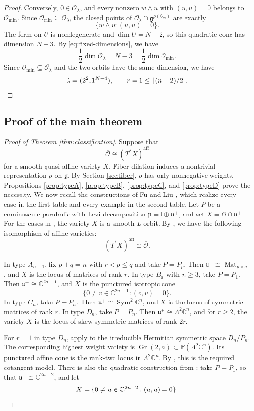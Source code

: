 \documentclass[12pt]{article}
\theoremstyle{remark}
\theoremstyle{plain}
\DeclareMathOperator{\Sym}{Sym}
\DeclareMathOperator{\Mat}{Mat}
\newcommand{\C}{\mathbb C}
\newcommand{\Gm}{\mathbb G_m}
\newcommand{\PP}{\mathbb P}
\newcommand{\aff}{\mathrm{aff}}
\begin{document}
\begin{proof}
Conversely, $0\in\overline{\mathcal O_\lambda}$, and every nonzero
$w\wedge u$ with $(u,u)=0$ belongs to $\mathcal O_{\min}$.
Since
$\overline{\mathcal O}_{\min}\subseteq
\overline{\mathcal O_\lambda}$, the closed points of
$\overline{\mathcal O_\lambda}\cap\mathfrak g^{\rho(\Gm)}$ are
exactly
\[
\{w\wedge u:(u,u)=0\}.
\]
The form on $U$ is nondegenerate and $\dim U=N-2$, so this quadratic
cone has dimension $N-3$. By \eqref{eq:fixed-dimensions}, we have
\[
\frac12\dim\mathcal O_\lambda=N-3
=\frac12\dim\mathcal O_{\min}.
\]
Since $\mathcal O_{\min}\subseteq\overline{\mathcal O_\lambda}$ and
the two orbits have the same dimension, we have
\[
\lambda=(2^2,1^{N-4}),
\qquad
r=1\leq\lfloor(n-2)/2\rfloor.\qedhere
\]
\end{proof}

\subsection{Proof of the main theorem}\label{sec:mainproof}

\begin{proof}[Proof of Theorem \ref{thm:classification}]
Suppose that
\[
\overline{\mathcal O}\cong(T^*X)^{\aff}
\]
for a smooth quasi-affine variety $X$.
Fiber dilation induces a nontrivial representation $\rho$ on
$\mathfrak g$. By Section \ref{sec:fiber}, $\rho$ has only nonnegative
weights.
Propositions \ref{prop:typeA}, \ref{prop:typeB}, \ref{prop:typeC},
and \ref{prop:typeD} prove the necessity.
We now recall the constructions of Fu and Liu \cite{FuLiu}, which
realize every case in the first table and every example in the second
table.
Let $P$ be a cominuscule parabolic with Levi decomposition
$\mathfrak p=\mathfrak l\oplus\mathfrak u^+$, and set
$X=\mathcal O\cap\mathfrak u^+$.
For the cases in \cite[Table 1]{FuLiu}, the variety $X$ is a smooth
$L$-orbit. By \cite[Theorem 4.2]{FuLiu}, we have the following
isomorphism of affine varieties:
\[
(T^*X)^{\aff}\cong\overline{\mathcal O}.
\]

In type $A_{n-1}$, fix $p+q=n$ with $r<p\leq q$ and take $P=P_p$.
Then $\mathfrak u^+\cong\Mat_{p\times q}$, and $X$ is the locus of
matrices of rank $r$.
In type $B_n$ with $n\geq3$, take $P=P_1$. Then
$\mathfrak u^+\cong\C^{2n-1}$, and $X$ is the punctured isotropic cone
\[
\{0\ne v\in\C^{2n-1}:(v,v)=0\}.
\]
In type $C_n$, take $P=P_n$. Then
$\mathfrak u^+\cong\Sym^2\C^n$, and $X$ is the locus of symmetric
matrices of rank $r$. In type $D_n$, take $P=P_n$. Then
$\mathfrak u^+\cong\Lambda^2\C^n$, and for $r\geq2$, the variety $X$
is the locus of skew-symmetric matrices of rank $2r$.

For $r=1$ in type $D_n$, apply \cite[Theorem 1.4]{FuLiu} to the
irreducible Hermitian symmetric space $D_n/P_n$.
The corresponding highest weight variety is
$\operatorname{Gr}(2,n)\subset\PP(\Lambda^2\C^n)$.
Its punctured affine cone is the rank-two locus in $\Lambda^2\C^n$.
By \cite[Theorem 1.4]{FuLiu}, this is the required cotangent model.
There is also the quadratic construction from
\cite[Table 1 and Theorem 4.2]{FuLiu}: take $P=P_1$, so that
$\mathfrak u^+\cong\C^{2n-2}$, and let
\[
X=\{0\ne u\in\C^{2n-2}:(u,u)=0\}.\qedhere
\]
\end{proof}
\end{document}
